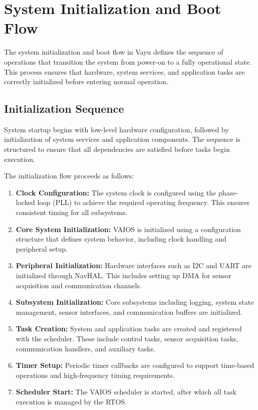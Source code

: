 \section{System Initialization and Boot Flow}
\label{sec:vayu_boot}

The system initialization and boot flow in Vayu defines the sequence of operations that transition the system from power-on to a fully operational state. This process ensures that hardware, system services, and application tasks are correctly initialized before entering normal operation.

\subsection{Initialization Sequence}

System startup begins with low-level hardware configuration, followed by initialization of system services and application components. The sequence is structured to ensure that all dependencies are satisfied before tasks begin execution.

The initialization flow proceeds as follows:

\begin{enumerate}
    \item \textbf{Clock Configuration:}  
    The system clock is configured using the phase-locked loop (PLL) to achieve the required operating frequency. This ensures consistent timing for all subsystems.

    \item \textbf{Core System Initialization:}  
    VAIOS is initialized using a configuration structure that defines system behavior, including clock handling and peripheral setup.

    \item \textbf{Peripheral Initialization:}  
    Hardware interfaces such as I2C and UART are initialized through NavHAL. This includes setting up DMA for sensor acquisition and communication channels.

    \item \textbf{Subsystem Initialization:}  
    Core subsystems including logging, system state management, sensor interfaces, and communication buffers are initialized.

    \item \textbf{Task Creation:}  
    System and application tasks are created and registered with the scheduler. These include control tasks, sensor acquisition tasks, communication handlers, and auxiliary tasks.

    \item \textbf{Timer Setup:}  
    Periodic timer callbacks are configured to support time-based operations and high-frequency timing requirements.

    \item \textbf{Scheduler Start:}  
    The VAIOS scheduler is started, after which all task execution is managed by the RTOS.
\end{enumerate}

